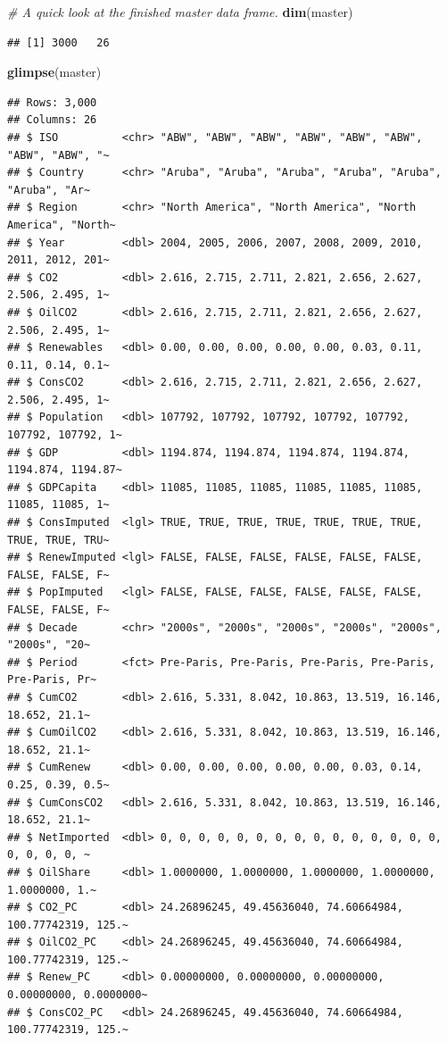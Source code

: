 \documentclass[
]{article}
\newenvironment{Shaded}{\begin{snugshade}}{\end{snugshade}}
\newcommand{\CommentTok}[1]{\textcolor[rgb]{0.56,0.35,0.01}{\textit{#1}}}
\newcommand{\FunctionTok}[1]{\textcolor[rgb]{0.13,0.29,0.53}{\textbf{#1}}}
\newcommand{\NormalTok}[1]{#1}
\begin{document}
\begin{Shaded}
\begin{Highlighting}[]
\CommentTok{\# A quick look at the finished master data frame.}
\FunctionTok{dim}\NormalTok{(master)}
\end{Highlighting}
\end{Shaded}

\begin{verbatim}
## [1] 3000   26
\end{verbatim}

\begin{Shaded}
\begin{Highlighting}[]
\FunctionTok{glimpse}\NormalTok{(master)}
\end{Highlighting}
\end{Shaded}

\begin{verbatim}
## Rows: 3,000
## Columns: 26
## $ ISO          <chr> "ABW", "ABW", "ABW", "ABW", "ABW", "ABW", "ABW", "ABW", "~
## $ Country      <chr> "Aruba", "Aruba", "Aruba", "Aruba", "Aruba", "Aruba", "Ar~
## $ Region       <chr> "North America", "North America", "North America", "North~
## $ Year         <dbl> 2004, 2005, 2006, 2007, 2008, 2009, 2010, 2011, 2012, 201~
## $ CO2          <dbl> 2.616, 2.715, 2.711, 2.821, 2.656, 2.627, 2.506, 2.495, 1~
## $ OilCO2       <dbl> 2.616, 2.715, 2.711, 2.821, 2.656, 2.627, 2.506, 2.495, 1~
## $ Renewables   <dbl> 0.00, 0.00, 0.00, 0.00, 0.00, 0.03, 0.11, 0.11, 0.14, 0.1~
## $ ConsCO2      <dbl> 2.616, 2.715, 2.711, 2.821, 2.656, 2.627, 2.506, 2.495, 1~
## $ Population   <dbl> 107792, 107792, 107792, 107792, 107792, 107792, 107792, 1~
## $ GDP          <dbl> 1194.874, 1194.874, 1194.874, 1194.874, 1194.874, 1194.87~
## $ GDPCapita    <dbl> 11085, 11085, 11085, 11085, 11085, 11085, 11085, 11085, 1~
## $ ConsImputed  <lgl> TRUE, TRUE, TRUE, TRUE, TRUE, TRUE, TRUE, TRUE, TRUE, TRU~
## $ RenewImputed <lgl> FALSE, FALSE, FALSE, FALSE, FALSE, FALSE, FALSE, FALSE, F~
## $ PopImputed   <lgl> FALSE, FALSE, FALSE, FALSE, FALSE, FALSE, FALSE, FALSE, F~
## $ Decade       <chr> "2000s", "2000s", "2000s", "2000s", "2000s", "2000s", "20~
## $ Period       <fct> Pre-Paris, Pre-Paris, Pre-Paris, Pre-Paris, Pre-Paris, Pr~
## $ CumCO2       <dbl> 2.616, 5.331, 8.042, 10.863, 13.519, 16.146, 18.652, 21.1~
## $ CumOilCO2    <dbl> 2.616, 5.331, 8.042, 10.863, 13.519, 16.146, 18.652, 21.1~
## $ CumRenew     <dbl> 0.00, 0.00, 0.00, 0.00, 0.00, 0.03, 0.14, 0.25, 0.39, 0.5~
## $ CumConsCO2   <dbl> 2.616, 5.331, 8.042, 10.863, 13.519, 16.146, 18.652, 21.1~
## $ NetImported  <dbl> 0, 0, 0, 0, 0, 0, 0, 0, 0, 0, 0, 0, 0, 0, 0, 0, 0, 0, 0, ~
## $ OilShare     <dbl> 1.0000000, 1.0000000, 1.0000000, 1.0000000, 1.0000000, 1.~
## $ CO2_PC       <dbl> 24.26896245, 49.45636040, 74.60664984, 100.77742319, 125.~
## $ OilCO2_PC    <dbl> 24.26896245, 49.45636040, 74.60664984, 100.77742319, 125.~
## $ Renew_PC     <dbl> 0.00000000, 0.00000000, 0.00000000, 0.00000000, 0.0000000~
## $ ConsCO2_PC   <dbl> 24.26896245, 49.45636040, 74.60664984, 100.77742319, 125.~
\end{verbatim}
\end{document}

